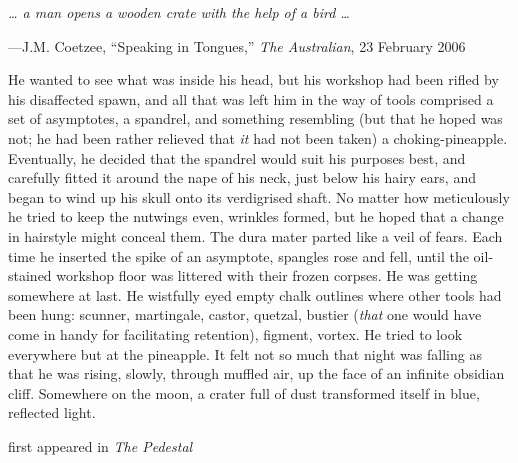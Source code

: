 \emph{\ldots{} a man opens a wooden crate with the help of a bird
\ldots{}}

---J.M. Coetzee, ``Speaking in Tongues,'' \emph{The Australian}, 23
February 2006

He wanted to see what was inside his head, but his workshop had been
rifled by his disaffected spawn, and all that was left him in the way of
tools comprised a set of asymptotes, a spandrel, and something
resembling (but that he hoped was not; he had been rather relieved that
\emph{it} had not been taken) a choking-pineapple. Eventually, he
decided that the spandrel would suit his purposes best, and carefully
fitted it around the nape of his neck, just below his hairy ears, and
began to wind up his skull onto its verdigrised shaft. No matter how
meticulously he tried to keep the nutwings even, wrinkles formed, but he
hoped that a change in hairstyle might conceal them. The dura mater
parted like a veil of fears. Each time he inserted the spike of an
asymptote, spangles rose and fell, until the oil-stained workshop floor
was littered with their frozen corpses. He was getting somewhere at
last. He wistfully eyed empty chalk outlines where other tools had been
hung: scunner, martingale, castor, quetzal, bustier (\emph{that} one
would have come in handy for facilitating retention), figment, vortex.
He tried to look everywhere but at the pineapple. It felt not so much
that night was falling as that he was rising, slowly, through muffled
air, up the face of an infinite obsidian cliff. Somewhere on the moon, a
crater full of dust transformed itself in blue, reflected light.

first appeared in \emph{The Pedestal}
